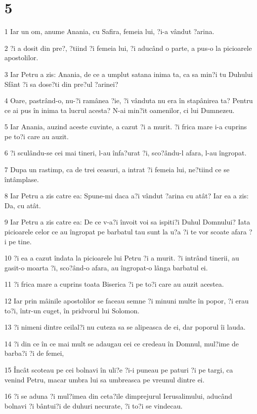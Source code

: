 \chapter{5}

\par 1 Iar un om, anume Anania, cu Safira, femeia lui, ?i-a vândut ?arina.
\par 2 ?i a dosit din pre?, ?tiind ?i femeia lui, ?i aducând o parte, a pus-o la picioarele apostolilor.
\par 3 Iar Petru a zis: Anania, de ce a umplut satana inima ta, ca sa min?i tu Duhului Sfânt ?i sa dose?ti din pre?ul ?arinei?
\par 4 Oare, pastrând-o, nu-?i ramânea ?ie, ?i vânduta nu era în stapânirea ta? Pentru ce ai pus în inima ta lucrul acesta? N-ai min?it oamenilor, ci lui Dumnezeu.
\par 5 Iar Anania, auzind aceste cuvinte, a cazut ?i a murit. ?i frica mare i-a cuprins pe to?i care au auzit.
\par 6 ?i sculându-se cei mai tineri, l-au înfa?urat ?i, sco?ându-l afara, l-au îngropat.
\par 7 Dupa un rastimp, ca de trei ceasuri, a intrat ?i femeia lui, ne?tiind ce se întâmplase.
\par 8 Iar Petru a zis catre ea: Spune-mi daca a?i vândut ?arina cu atât? Iar ea a zis: Da, cu atât.
\par 9 Iar Petru a zis catre ea: De ce v-a?i învoit voi sa ispiti?i Duhul Domnului? Iata picioarele celor ce au îngropat pe barbatul tau sunt la u?a ?i te vor scoate afara ?i pe tine.
\par 10 ?i ea a cazut îndata la picioarele lui Petru ?i a murit. ?i intrând tinerii, au gasit-o moarta ?i, sco?ând-o afara, au îngropat-o lânga barbatul ei.
\par 11 ?i frica mare a cuprins toata Biserica ?i pe to?i care au auzit acestea.
\par 12 Iar prin mâinile apostolilor se faceau semne ?i minuni multe în popor, ?i erau to?i, într-un cuget, în pridvorul lui Solomon.
\par 13 ?i nimeni dintre ceilal?i nu cuteza sa se alipeasca de ei, dar poporul îi lauda.
\par 14 ?i din ce în ce mai mult se adaugau cei ce credeau în Domnul, mul?ime de barba?i ?i de femei,
\par 15 Încât scoteau pe cei bolnavi în uli?e ?i-i puneau pe paturi ?i pe targi, ca venind Petru, macar umbra lui sa umbreasca pe vreunul dintre ei.
\par 16 ?i se aduna ?i mul?imea din ceta?ile dimprejurul Ierusalimului, aducând bolnavi ?i bântui?i de duhuri necurate, ?i to?i se vindecau.
